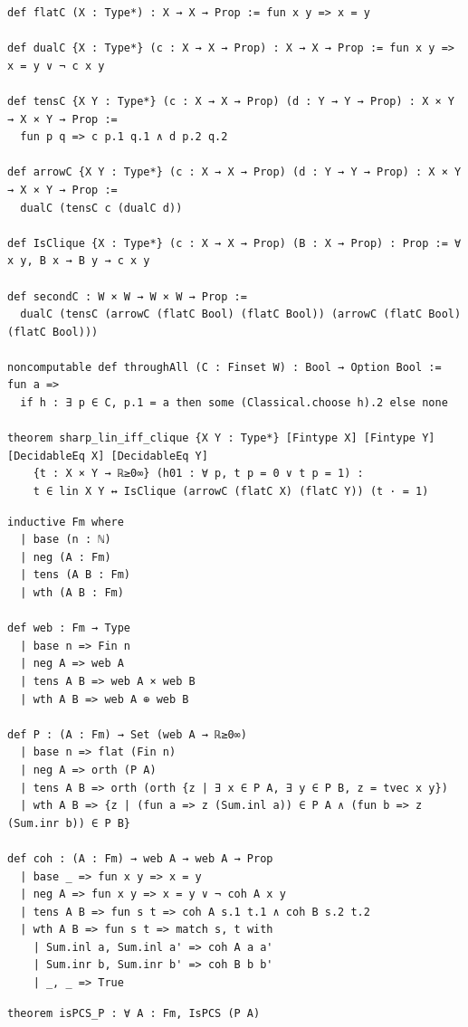 \label{lean:sharp-lin-iff-clique}
\begin{lstlisting}
def flatC (X : Type*) : X → X → Prop := fun x y => x = y

def dualC {X : Type*} (c : X → X → Prop) : X → X → Prop := fun x y => x = y ∨ ¬ c x y

def tensC {X Y : Type*} (c : X → X → Prop) (d : Y → Y → Prop) : X × Y → X × Y → Prop :=
  fun p q => c p.1 q.1 ∧ d p.2 q.2

def arrowC {X Y : Type*} (c : X → X → Prop) (d : Y → Y → Prop) : X × Y → X × Y → Prop :=
  dualC (tensC c (dualC d))

def IsClique {X : Type*} (c : X → X → Prop) (B : X → Prop) : Prop := ∀ x y, B x → B y → c x y

def secondC : W × W → W × W → Prop :=
  dualC (tensC (arrowC (flatC Bool) (flatC Bool)) (arrowC (flatC Bool) (flatC Bool)))

noncomputable def throughAll (C : Finset W) : Bool → Option Bool := fun a =>
  if h : ∃ p ∈ C, p.1 = a then some (Classical.choose h).2 else none

theorem sharp_lin_iff_clique {X Y : Type*} [Fintype X] [Fintype Y] [DecidableEq X] [DecidableEq Y]
    {t : X × Y → ℝ≥0∞} (h01 : ∀ p, t p = 0 ∨ t p = 1) :
    t ∈ lin X Y ↔ IsClique (arrowC (flatC X) (flatC Y)) (t · = 1)
\end{lstlisting}

\label{lean:linear-fm}
\begin{lstlisting}
inductive Fm where
  | base (n : ℕ)
  | neg (A : Fm)
  | tens (A B : Fm)
  | wth (A B : Fm)

def web : Fm → Type
  | base n => Fin n
  | neg A => web A
  | tens A B => web A × web B
  | wth A B => web A ⊕ web B

def P : (A : Fm) → Set (web A → ℝ≥0∞)
  | base n => flat (Fin n)
  | neg A => orth (P A)
  | tens A B => orth (orth {z | ∃ x ∈ P A, ∃ y ∈ P B, z = tvec x y})
  | wth A B => {z | (fun a => z (Sum.inl a)) ∈ P A ∧ (fun b => z (Sum.inr b)) ∈ P B}

def coh : (A : Fm) → web A → web A → Prop
  | base _ => fun x y => x = y
  | neg A => fun x y => x = y ∨ ¬ coh A x y
  | tens A B => fun s t => coh A s.1 t.1 ∧ coh B s.2 t.2
  | wth A B => fun s t => match s, t with
    | Sum.inl a, Sum.inl a' => coh A a a'
    | Sum.inr b, Sum.inr b' => coh B b b'
    | _, _ => True
\end{lstlisting}

\label{lean:ispcs-p}
\begin{lstlisting}
theorem isPCS_P : ∀ A : Fm, IsPCS (P A)
\end{lstlisting}

